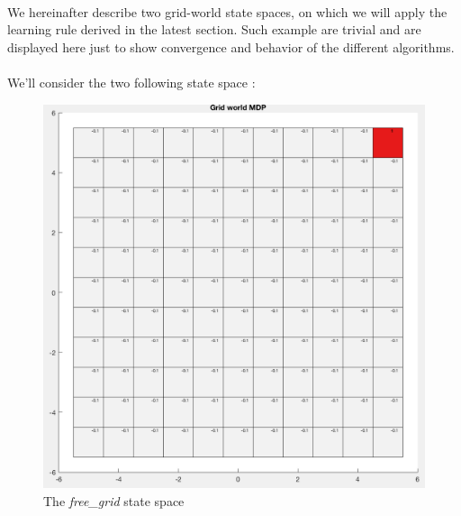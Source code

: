 \documentclass[a4paper]{report}
\begin{document}
{{			\paragraph{} We hereinafter describe two grid-world state spaces, on which we will apply the learning rule derived in the latest section. Such example are trivial and are displayed here just to show convergence and behavior of the different algorithms. 
			
			\paragraph{} We'll consider the two following state space : 
			\begin{figure}[h!]
				\begin{minipage}{0.45\linewidth}
					\includegraphics[width=\linewidth]{free_grid}
					\caption{The \emph{free\_grid} state space}
				\end{minipage}
				\hfill
				\begin{minipage}{0.45\linewidth}

\end{minipage}
\end{figure}}}
\end{document}
